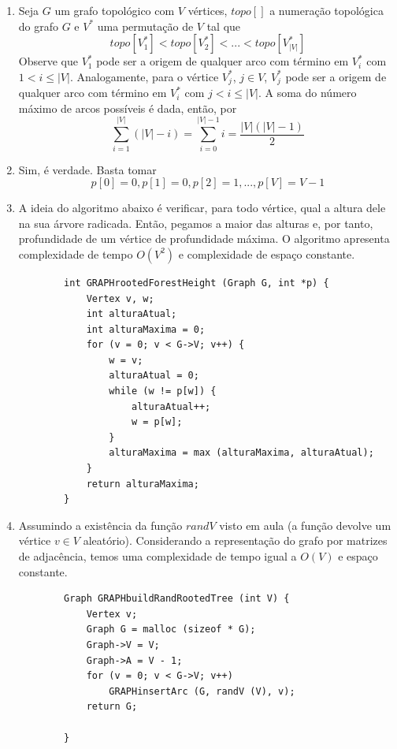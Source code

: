 \documentclass[12pt,letterpaper]{article}
\begin{document}
\begin{enumerate}
    \item Seja $G$ um grafo topológico com $V$ vértices, $topo[]$ a numeração topológica do grafo $G$ e $V^*$ uma permutação de $V$ tal que
    $$ topo[V^*_1] < topo[V^*_2] < ... < topo[V^*_{|V|}] $$
    Observe que $V^*_1$ pode ser a origem de qualquer arco com término em $V^*_i$ com $1 < i \leq |V|$. Analogamente, para o vértice $V^*_j$, $j \in V$, $V^*_j$ pode ser a origem de qualquer arco com término em $V^*_i$ com $j < i \leq |V|$.
    A soma do número máximo de arcos possíveis é dada, então, por
    $$ \sum_{i = 1}^{|V|} (|V| - i) = \sum_{i = 0}^{|V|-1} i = \frac{|V|(|V|-1)}{2} $$

    \item Sim, é verdade. Basta tomar
    $$ p[0] = 0, p[1] = 0, p[2] = 1, ..., p[V] = V-1$$

    \item A ideia do algoritmo abaixo é verificar, para todo vértice, qual a altura dele na sua árvore radicada. Então, pegamos a maior das alturas e, por tanto, profundidade de um vértice de profundidade máxima. O algoritmo apresenta complexidade de tempo $O(V^2)$ e complexidade de espaço constante.
    \clearpage
    \begin{lstlisting}
        int GRAPHrootedForestHeight (Graph G, int *p) {
            Vertex v, w;
            int alturaAtual;
            int alturaMaxima = 0;
            for (v = 0; v < G->V; v++) {
                w = v;
                alturaAtual = 0;
                while (w != p[w]) {
                    alturaAtual++;
                    w = p[w];
                }
                alturaMaxima = max (alturaMaxima, alturaAtual);
            }
            return alturaMaxima;
        }
    \end{lstlisting}

    \item Assumindo a existência da função $randV$ visto em aula (a função devolve um vértice $v \in V$ aleatório). Considerando a representação do grafo por matrizes de adjacência, temos uma complexidade de tempo igual a $O(V)$ e espaço constante.
    \begin{lstlisting}
        Graph GRAPHbuildRandRootedTree (int V) {
            Vertex v;
            Graph G = malloc (sizeof * G);
            Graph->V = V;
            Graph->A = V - 1;
            for (v = 0; v < G->V; v++)
                GRAPHinsertArc (G, randV (V), v);
            return G;

        }
    \end{lstlisting}


\end{enumerate}
\end{document}
